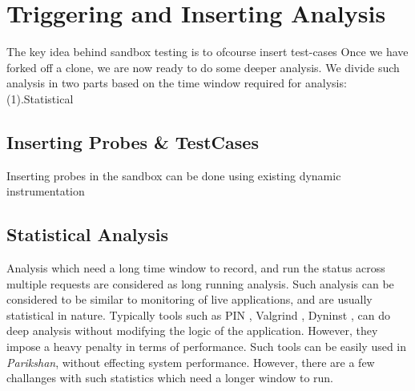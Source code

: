 \section{Triggering and Inserting Analysis}
\label{sec:trigger}

The key idea behind sandbox testing is to ofcourse insert test-cases 
Once we have forked off a clone, we are now ready to do some deeper analysis. 
We divide such analysis in two parts based on the time window required for analysis: (1).Statistical

\subsection{Inserting Probes \& TestCases}
\label{sec:unitTests}

Inserting probes in the sandbox can be done using existing dynamic instrumentation

\subsection{Statistical Analysis}
\label{sec:statisticalTests}

Analysis which need a long time window to record, and run the status across multiple requests are considered as long running analysis. 
Such analysis can be considered to be similar to monitoring of live applications, and are usually statistical in nature.
Typically tools such as PIN \cite{pin}, Valgrind \cite{valgrind}, Dyninst \cite{dyninst}, can do deep analysis without modifying the logic of the application.
However, they impose a heavy penalty in terms of performance.
Such tools can be easily used in \textit{Parikshan}, without effecting system performance.
However, there are a few challanges with such statistics which need a longer window to run.

